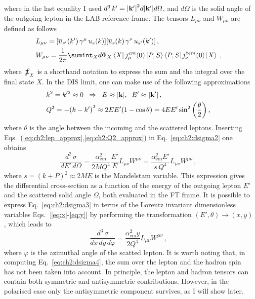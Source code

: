 where in the last equality I used $d^3 \, k' = \qty| \vb{k}' |^2 d|\vb{k}'| d\Omega$, and $d\Omega$ is the solid angle of the outgoing lepton in the LAB reference frame. The tensors $L_{\mu\nu}$ and $W_{\mu\nu}$ are defined as follows
\begin{align}
    &L_{\mu\nu} = \qty[ \overline{u}_{s'}(k') \, \gamma^{\mu}\, u_s(k)] \qty[\overline{u}_{s}(k) \,\gamma^{\nu}\, u_{s'}(k') ] \,,
    \label{eq:ch2:lep_tens} \\
    &W_{\mu\nu} = \frac{1}{2\pi} \sumint_{X}  d\Phi_X  \bra{X} j_{\mu}^{em} (0) \ket{P,S}  \bra{P,S} j_{\nu}^{\dag em} (0) \ket{X}  \,,
    \label{eq:ch2:had_tens}
\end{align}
where $\sumint_{X}$ is a shorthand notation to express the sum and the integral over the final state $X$. In the DIS limit, one can make use of the following approximations
\begin{align}
    &k^2 = k'^2 \approx 0 \hspace{2mm} \Rightarrow \hspace{2mm} E \approx \qty| \vb{k} |, \hspace{2mm} E' \approx \qty| \vb{k'}|  \,,
    \label{eq:ch2:lep_approx}\\
    &Q^2 = - \qty(k - k')^2 \approx  2EE' \qty(1 - \cos \theta) = 4EE' \sin^2 \qty(\frac{\theta}{2}) \,,
    \label{eq:ch2:Q2_approx}
\end{align}
where $\theta$ is the angle between the incoming and the scattered leptons. Inserting Eqs.~(\ref{eq:ch2:lep_approx},\ref{eq:ch2:Q2_approx}) in Eq.~\eqref{eq:ch2:dsigma2} one obtains 
\begin{equation}
    \frac{d^2\,\sigma}{dE' \, d\Omega} = \frac{\alpha_{\textrm{em}}^2}{2MQ^4} \frac{E'}{E} L_{\mu\nu}W^{\mu\nu} = \frac{\alpha_{\textrm{em}}^2 E'}{s\, Q^4} L_{\mu\nu}W^{\mu\nu}\,,
    \label{eq:ch2:dsigma3}
\end{equation}
where $s = (k + P)^2 \approx 2 M E$ is the Mandelstam variable. This expression gives the differential cross-section as a function of the energy of the outgoing lepton $E'$ and the scattered solid angle $\Omega$, both evaluated in the FT frame. It is possible to express Eq.~\eqref{eq:ch2:dsigma3} in terms of the Lorentz invariant dimensionless variables Eqs.~[\ref{eq:x}-\ref{eq:y}] by performing the transformation $(E', \theta) \rightarrow (x,y)$, which leads to
\begin{equation}
    \frac{d^3 \, \sigma}{dx \, dy \, d\varphi} = \frac{\alpha_{\textrm{em}}^2 y}{2 Q^4} L_{\mu\nu} W^{\mu\nu} \,,
    \label{eq:ch2:dsigma4}
\end{equation}
where $\varphi$ is the azimuthal angle of the scatted lepton. It is worth noting that, in computing Eq.~\eqref{eq:ch2:dsigma4}, the sum over the lepton and the hadron spin has not been taken into account. In principle, the lepton and hadron tensors can contain both symmetric and antisymmetric contributions. However, in the polarised case only the antisymmetric component survives, as I will show later.


